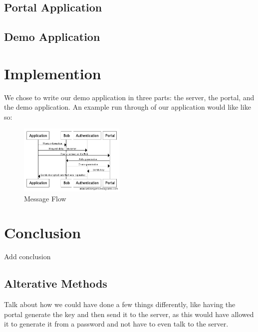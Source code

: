 \documentclass[letterpaper,twocolumn,10pt]{article}
\begin{document}
\subsection{Portal Application}
\subsection{Demo Application}

\section{Implemention}
    We chose to write our demo application in three parts: the server, the portal, and the demo application. An example run through of our application would like like so:
\begin{figure}[ht]
\includegraphics[width=0.45\textwidth]{messageDiagram}
\caption{Message Flow}
\end{figure}

\section{Conclusion}
    Add conclusion
\subsection{Alterative Methods}

Talk about how we could have done a few things differently, like having the portal generate the key and then send it to the server, as this would have allowed it to generate it from a password and not have to even talk to the server.


{
    \small
    
    
}
\end{document}
